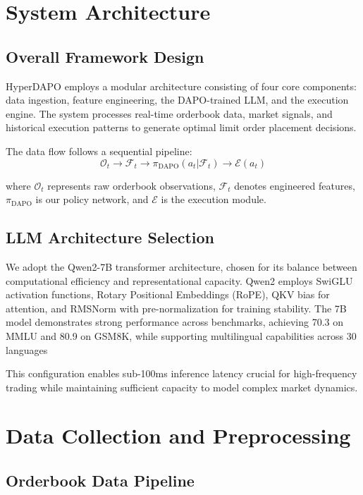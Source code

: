 \documentclass{report}
\begin{document}
\section{System Architecture}

\subsection{Overall Framework Design}

HyperDAPO employs a modular architecture consisting of four core components: data ingestion, feature engineering, the DAPO-trained LLM, and the execution engine. The system processes real-time orderbook data, market signals, and historical execution patterns to generate optimal limit order placement decisions.

The data flow follows a sequential pipeline:
\begin{equation}
\mathcal{O}_t \rightarrow \mathcal{F}_t \rightarrow \pi_{\text{DAPO}}(a_t|\mathcal{F}_t) \rightarrow \mathcal{E}(a_t)
\end{equation}

where $\mathcal{O}_t$ represents raw orderbook observations, $\mathcal{F}_t$ denotes engineered features, $\pi_{\text{DAPO}}$ is our policy network, and $\mathcal{E}$ is the execution module.

\subsection{LLM Architecture Selection}

We adopt the Qwen2-7B transformer architecture, chosen for its balance between computational efficiency and representational capacity. Qwen2 employs SwiGLU activation functions, Rotary Positional Embeddings (RoPE), QKV bias for attention, and RMSNorm with pre-normalization for training stability. The 7B model demonstrates strong performance across benchmarks, achieving 70.3 on MMLU and 80.9 on GSM8K, while supporting multilingual capabilities across 30 languages \cite{Qwen2024}

This configuration enables sub-100ms inference latency crucial for high-frequency trading while maintaining sufficient capacity to model complex market dynamics.

\section{Data Collection and Preprocessing}

\subsection{Orderbook Data Pipeline}
\end{document}
